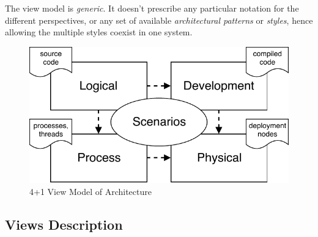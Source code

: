 \documentclass[thesis=M,english,hidelinks]{FITthesis}[2012/10/20]
\begin{document}
The view model is \textit{generic}. It doesn't prescribe any particular notation for the different perspectives, or any set of available \textit{architectural patterns} or \textit{styles}, hence allowing the multiple styles coexist in one system.

\begin{figure}
  \centering
    \includegraphics{images/4+1_view.pdf}
    \caption{4+1 View Model of Architecture}
    \label{fig:arch-41-view}
\end{figure}

\subsection{Views Description}
\label{sec:41-views-description}
\end{document}
